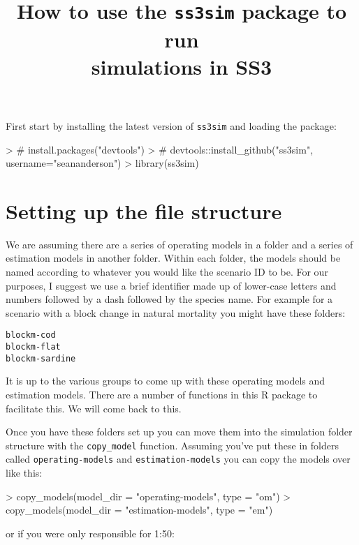 \documentclass[12pt]{article}
\title{How to use the \texttt{ss3sim} package to run\\simulations in SS3}
\date{}
\begin{document}
\maketitle

\noindent
First start by installing the latest version of \texttt{ss3sim} and loading the
package:

\begin{Schunk}
\begin{Sinput}
> # install.packages("devtools")
> # devtools::install_github("ss3sim", username="seananderson")
> library(ss3sim)
\end{Sinput}
\end{Schunk}

\section*{Setting up the file structure}
We are assuming there are a series of operating models in a folder and a series
of estimation models in another folder. Within each folder, the models should be
named according to whatever you would like the scenario ID to be. For our
purposes, I suggest we use a brief identifier made up of lower-case letters and
numbers followed by a dash followed by the species name. For example for a
scenario with a block change in natural mortality you might have these folders:

\begin{verbatim}
blockm-cod
blockm-flat
blockm-sardine
\end{verbatim}

\noindent
It is up to the various groups to come up with these operating models and
estimation models. There are a number of functions in this R package to
facilitate this. We will come back to this. 

Once you have these folders set up you can move them into the simulation folder
structure with the \texttt{copy\_model} function. Assuming you've put these in
folders called \texttt{operating-models} and \texttt{estimation-models} you can
copy the models over like this:

\begin{Schunk}
\begin{Sinput}
> copy_models(model_dir = "operating-models", type = "om")
> copy_models(model_dir = "estimation-models", type = "em")
\end{Sinput}
\end{Schunk}

\noindent
or if you were only responsible for 1:50:
\end{document}

